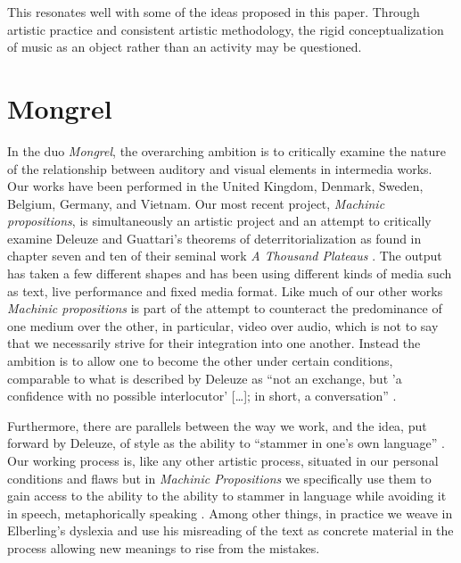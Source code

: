\documentclass[11pt]{article}
\begin{document}
This resonates well with some of the ideas proposed in this paper. Through artistic practice and consistent artistic methodology, the rigid conceptualization of music as an object rather than an activity may be questioned.


\section*{Mongrel}
\label{sec:mongrel}

In the duo \emph{Mongrel}, the overarching ambition is to critically
examine the nature of the relationship between auditory and visual
elements in intermedia works. Our works have been performed in the
United Kingdom, Denmark, Sweden, Belgium, Germany, and Vietnam. Our
most recent project, \emph{Machinic propositions}, is simultaneously
an artistic project and an attempt to critically examine Deleuze and
Guattari's theorems of deterritorialization as found in chapter seven
and ten of their seminal work \emph{A Thousand Plateaus}
\citep{deleuze80}. The output has taken a few different shapes and
has been using different kinds of media such as text, live
performance and fixed media
format. Like much of our other works \emph{Machinic propositions} is
part of the attempt to counteract the predominance of one medium over
the other, in particular, video over audio, which is not to say that we necessarily
strive for their integration into one another. Instead the ambition
is to allow one to become the other under certain conditions,
comparable to what is described by Deleuze as ``not an exchange, but
'a confidence with no possible interlocutor' [\ldots]; in short, a
conversation'' \citep[p. 2. The quotation contains an unspecified reference.]{deleuze77}.

Furthermore, there are parallels between the way we work,
and the idea, put forward by Deleuze, of style as the ability to
``stammer in one's own language'' \citep[p. 3]{deleuze77}. Our working
process is, like any other artistic process, situated in our personal conditions and
flaws but in \emph{Machinic Propositions} we specifically use them to
gain access to the ability to the ability to stammer in
language while avoiding it in speech,
metaphorically speaking \citep[p. 3]{deleuze77}. Among other things,
in practice we weave in Elberling's dyslexia and use his
misreading of the text as concrete material in the process allowing
new meanings to rise from the mistakes.
\end{document}
